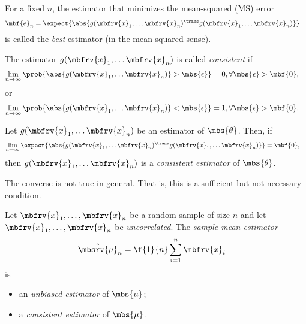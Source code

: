 \begin{definitionBox}
   For a fixed $n$, the estimator that minimizes the mean-squared (MS) error 
   \begin{align}
       \mbf{e}_{n} &= \expect{\abs{g(\mbfrv{x}_{1},\ldots\mbfrv{x}_{n})^{\trans}g(\mbfrv{x}_{1},\ldots\mbfrv{x}_{n})}}
   \end{align}
   is called the \emph{best} estimator (in the mean-squared sense).
\end{definitionBox}

\begin{definitionBox}[Consistency]
    The estimator $g(\mbfrv{x}_{1},\ldots\mbfrv{x}_{n})$ is called \emph{consistent} if 
    \begin{align}
        \lim_{n\to\infty} \prob{\abs{g(\mbfrv{x}_{1},\ldots\mbfrv{x}_{n})}>\mbs{\epsilon}} &= 0, \forall \mbs{\epsilon}>\mbf{0},
    \end{align}
    or
    \begin{align}
        \lim_{n\to\infty} \prob{\abs{g(\mbfrv{x}_{1},\ldots\mbfrv{x}_{n})}<\mbs{\epsilon}} &= 1, \forall \mbs{\epsilon}>\mbf{0}.
    \end{align}
\end{definitionBox}

\begin{mytheorem}
    Let $g(\mbfrv{x}_{1},\ldots\mbfrv{x}_{n})$ be an estimator of $\mbs{\theta}$. Then, if
    \begin{align}
        \lim_{n\to\infty} \expect{\abs{g(\mbfrv{x}_{1},\ldots\mbfrv{x}_{n})^{\trans}g(\mbfrv{x}_{1},\ldots\mbfrv{x}_{n})}} &= \mbf{0},
    \end{align}
    then $g(\mbfrv{x}_{1},\ldots\mbfrv{x}_{n})$ is a \emph{consistent estimator} of $\mbs{\theta}$.

    The converse is not true in general. That is, this is a sufficient but not necessary condition.
\end{mytheorem}


\begin{mytheorem}
     Let $\mbfrv{x}_{1},\ldots, \mbfrv{x}_{n}$ be a random sample of size $n$ and let $\mbfrv{x}_{1},\ldots, \mbfrv{x}_{n}$ be \emph{uncorrelated}. The \emph{sample mean estimator}
     \begin{align}
         \hat{\mbsrv{\mu}}_{n} &= \f{1}{n}\sum_{i=1}^{n}\mbfrv{x}_{i}
     \end{align}
     is
     \begin{itemize}
         \item an \emph{unbiased estimator} of $\mbs{\mu}$;
         \item a \emph{consistent estimator} of $\mbs{\mu}$.
     \end{itemize}
\end{mytheorem}

